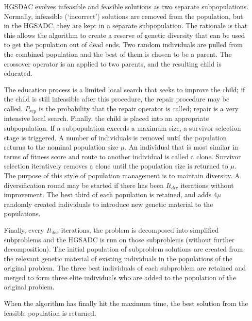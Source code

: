 \documentclass{sig-alternate}
\begin{document}
HGSDAC evolves infeasible and feasible solutions as two separate subpopulations. Normally, infeasible (`incorrect') solutions are removed from the population, but in the HGSADC, they are kept in a separate subpopulation. The rationale is that this allows the algorithm to create a reserve of genetic diversity that can be used to get the population out of dead ends. Two random individuals are pulled from the combined population and the best of them is chosen to be a parent. The crossover operator is an applied to two parents, and the resulting child is educated.

The education process is a limited local search that seeks to improve the child; if the child is still infeasible after this procedure, the repair procedure may be called. $P_{rep}$ is the probability that the repair operator is called; repair is a very intensive local search. Finally, the child is placed into an appropriate subpopulation. If a subpopulation exceeds a maximum size, a survivor selection stage is triggered. A number of individuals is removed until the population returns to the nominal population size $\mu$. An individual that is most similar in terms of fitness score and route to another individual is called a clone. Survivor selection iteratively removes a clone until the population size is returned to $\mu$. The purpose of this style of population management is to maintain diversity. A diversification round may be started if there has been $It_{div}$ iterations without improvement. The best third of each population is retained, and adds $4\mu$ randomly created individuals to introduce new genetic material to the populations. 

Finally, every $It_{dec}$ iterations, the problem is decomposed into simplified subproblems and the HGSADC is run on those subproblems (without further decomposition). The initial population of subproblem solutions are created from the relevant genetic material of existing individuals in the populations of the original problem. The three best individuals of each subproblem are retained and merged to form three elite individuals who are added to the population of the original problem.

When the algorithm has finally hit the maximum time, the best solution from the feasible population is returned.
\end{document}
